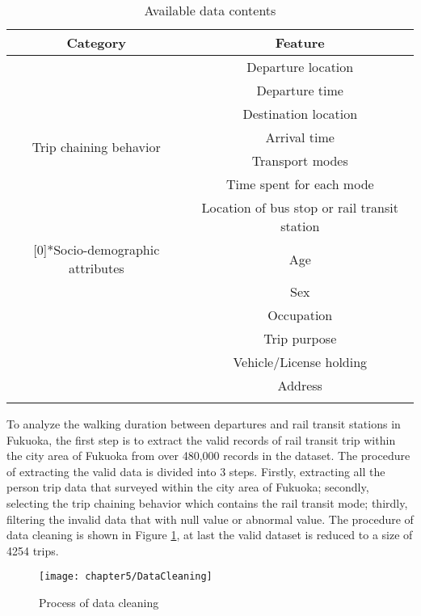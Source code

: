 \begin{table}[htbp]
	\centering
	\caption{Available data contents}
	\label{tab:chp5:Data}
	\small
	\renewcommand{\arraystretch}{1.25} %
	\begin{tabular}{cc}
		\Xhline{1.5pt}
		Category                      & Feature\\
		\midrule
		\multirow{7}[0]{*}{Trip chaining behavior} 
		& Departure location \\
		& Departure time \\
		& Destination location \\
		& Arrival time \\
		& Transport modes \\
		& Time spent for each mode \\
		& Location of bus stop or rail transit station \\
		\Xhline{0.5pt}
		
		\multirow{6}[0]{*}{Socio-demographic attributes}
		& Age \\
		& Sex \\
		& Occupation \\
		& Trip purpose \\
		& Vehicle/License holding \\
		& Address \\
		\Xhline{1.5pt}
	\end{tabular}
\end{table}

%
To analyze the walking duration between departures and rail transit stations in Fukuoka, the first step is to extract the valid records of rail transit trip within the city area of Fukuoka from over 480,000 records in the dataset. The procedure of extracting the valid data is divided into 3 steps. Firstly, extracting all the person trip data that surveyed within the city area of Fukuoka; secondly, selecting the trip chaining behavior which contains the rail transit mode; thirdly, filtering the invalid data that with null value or abnormal value. The procedure of data cleaning is shown in Figure \ref{fig:chp5:DataCleaning}, at last the valid dataset is reduced to a size of 4254 trips.

\begin{figure}[htbp]
	\centering
	\texttt{[image: chapter5/DataCleaning]}
	\caption{Process of data cleaning}
	\label{fig:chp5:DataCleaning}
\end{figure}

